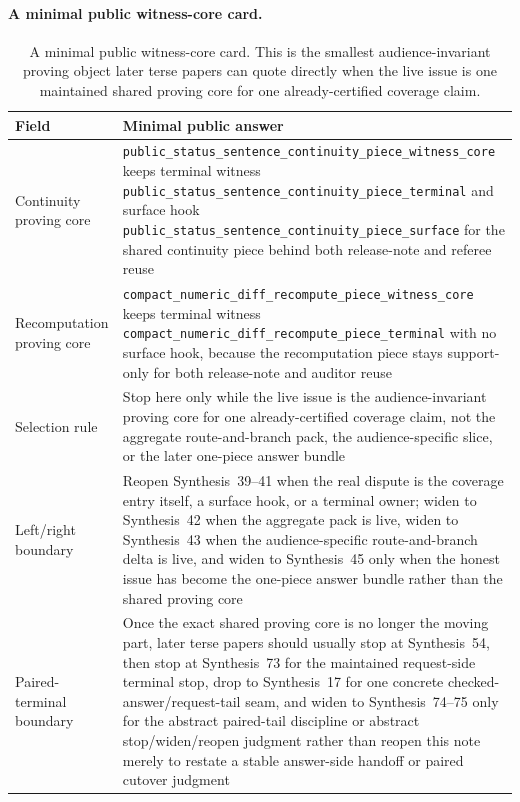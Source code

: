 \documentclass[11pt]{article}
\begin{document}
\paragraph{A minimal public witness-core card.}
\begin{table}[t]
\centering
\small
\begin{tabularx}{\linewidth}{@{}LY@{}}
\toprule
Field & Minimal public answer \\
\midrule
Continuity proving core & \nolinkurl{public_status_sentence_continuity_piece_witness_core} keeps terminal witness \nolinkurl{public_status_sentence_continuity_piece_terminal} and surface hook \nolinkurl{public_status_sentence_continuity_piece_surface} for the shared continuity piece behind both release-note and referee reuse \\
Recomputation proving core & \nolinkurl{compact_numeric_diff_recompute_piece_witness_core} keeps terminal witness \nolinkurl{compact_numeric_diff_recompute_piece_terminal} with no surface hook, because the recomputation piece stays support-only for both release-note and auditor reuse \\
Selection rule & Stop here only while the live issue is the audience-invariant proving core for one already-certified coverage claim, not the aggregate route-and-branch pack, the audience-specific slice, or the later one-piece answer bundle \\
Left/right boundary & Reopen Synthesis~39--41 when the real dispute is the coverage entry itself, a surface hook, or a terminal owner; widen to Synthesis~42 when the aggregate pack is live, widen to Synthesis~43 when the audience-specific route-and-branch delta is live, and widen to Synthesis~45 only when the honest issue has become the one-piece answer bundle rather than the shared proving core \\
Paired-terminal boundary & Once the exact shared proving core is no longer the moving part, later terse papers should usually stop at Synthesis~54, then stop at Synthesis~73 for the maintained request-side terminal stop, drop to Synthesis~17 for one concrete checked-answer/request-tail seam, and widen to Synthesis~74--75 only for the abstract paired-tail discipline or abstract stop/widen/reopen judgment rather than reopen this note merely to restate a stable answer-side handoff or paired cutover judgment \\
\bottomrule
\end{tabularx}
\caption{A minimal public witness-core card. This is the smallest audience-invariant proving object later terse papers can quote directly when the live issue is one maintained shared proving core for one already-certified coverage claim.}
\label{tab:minimal-public-witness-core-card}
\end{table}
\end{document}
